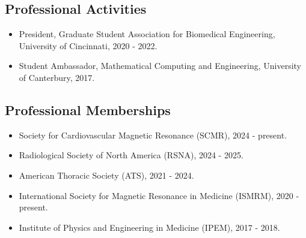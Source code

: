 \documentclass[12pt,]{scrartcl}
\begin{document}


\subsection{Professional Activities}\label{professional-activities}

\begin{itemize}
  \leftskip-0.25in
  \item President, Graduate Student Association for Biomedical Engineering, University of Cincinnati, 2020 - 2022.
  \item Student Ambassador, Mathematical Computing and Engineering, University of Canterbury, 2017.

\end{itemize}

\subsection{Professional Memberships}\label{professional-memberships}

\begin{itemize}
  \leftskip-0.25in
  \item Society for Cardiovascular Magnetic Resonance (SCMR), 2024 - present.
  \item Radiological Society of North America (RSNA), 2024 - 2025.
  \item American Thoracic Society (ATS), 2021 - 2024.
  \item International Society for Magnetic Resonance in Medicine (ISMRM), 2020 - present.
  \item Institute of Physics and Engineering in Medicine (IPEM), 2017 - 2018.
\end{itemize}
\end{document}
